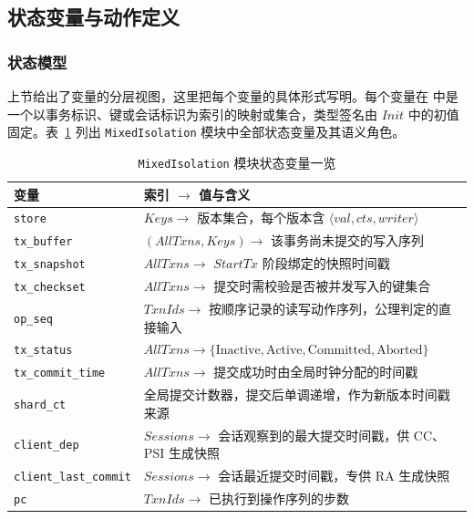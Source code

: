 \subsection{状态变量与动作定义}
\subsubsection{状态模型}

上节给出了变量的分层视图，这里把每个变量的具体形式写明。每个变量在 \TLAPlus 中是一个以事务标识、键或会话标识为索引的映射或集合，类型签名由 $Init$ 中的初值固定。表~\ref{tab:tla-state-vars} 列出 \texttt{MixedIsolation} 模块中全部状态变量及其语义角色。

\begin{table}[htbp]
    \centering
    \caption{\texttt{MixedIsolation} 模块状态变量一览}
    \label{tab:tla-state-vars}
    \footnotesize
    \renewcommand{\arraystretch}{1.45}
    \begin{tabularx}{\textwidth}{lX}
        \toprule
        变量                            & 索引 $\to$ 值与含义                                                                      \\
        \midrule
        \texttt{store}                & $Keys \to$ 版本集合，每个版本含 $\langle val, cts, writer \rangle$                           \\
        \texttt{tx\_buffer}           & $(AllTxns, Keys) \to$ 该事务尚未提交的写入序列                                                 \\
        \texttt{tx\_snapshot}         & $AllTxns \to$ $StartTx$ 阶段绑定的快照时间戳                                                 \\
        \texttt{tx\_checkset}         & $AllTxns \to$ 提交时需校验是否被并发写入的键集合                                                    \\
        \texttt{op\_seq}              & $TxnIds \to$ 按顺序记录的读写动作序列，公理判定的直接输入                                                \\
        \texttt{tx\_status}           & $AllTxns \to \{\text{Inactive}, \text{Active}, \text{Committed}, \text{Aborted}\}$ \\
        \texttt{tx\_commit\_time}     & $AllTxns \to$ 提交成功时由全局时钟分配的时间戳                                                     \\
        \texttt{shard\_ct}            & 全局提交计数器，提交后单调递增，作为新版本时间戳来源                                                         \\
        \texttt{client\_dep}          & $Sessions \to$ 会话观察到的最大提交时间戳，供 CC、PSI 生成快照                                         \\
        \texttt{client\_last\_commit} & $Sessions \to$ 会话最近提交时间戳，专供 RA 生成快照                                                \\
        \texttt{pc}                   & $TxnIds \to$ 已执行到操作序列的步数                                                           \\
        \bottomrule
    \end{tabularx}
\end{table}

